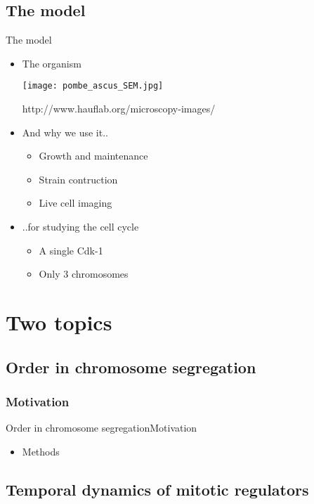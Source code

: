\subsection{The model}
\begin{frame}{The model}

\begin{itemize}
\item{ The organism
\begin{center}
\texttt{[image: pombe\_ascus\_SEM.jpg]}

\tiny{http://www.hauflab.org/microscopy-images/}
\end{center}}
\item And why we use it..
\begin{itemize}
\item Growth and maintenance
\item Strain contruction
\item Live cell imaging
\end{itemize}
\item ..for studying the cell cycle
\begin{itemize}
\uncover \item A single Cdk-1
\item Only 3 chromosomes
\end{itemize}
\end{itemize}

\end{frame}

\section{Two topics}
\subsection{Order in chromosome segregation}
\subsubsection{Motivation}
\begin{frame}{Order in chromosome segregation}{Motivation}
\begin{itemize}
\item Methods
\end{itemize}
\end{frame}

\subsection{Temporal dynamics of mitotic regulators}
